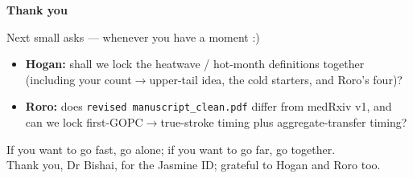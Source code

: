 \documentclass[aspectratio=169,10pt]{beamer}
\begin{document}
\begin{frame}[plain]
  \vspace{1.1cm}
  {\color{LaidlawNavy}\LARGE\bfseries Thank you\par}
  \vspace{0.55em}
  {\large\color{LaidlawTeal}
  Next small asks --- whenever you have a moment :)\par}

  \vspace{0.85em}
  \footnotesize
  \begin{itemize}
    \item \textbf{Hogan:} shall we lock the heatwave / hot-month definitions together
      (including your count$\to$upper-tail idea, the cold starters, and Roro's four)?
    \item \textbf{Roro:} does \texttt{revised manuscript\_clean.pdf} differ from medRxiv v1,
      and can we lock first-GOPC$\to$true-stroke timing plus aggregate-transfer timing?
  \end{itemize}

  \vspace{1.0em}
  {\small
  If you want to go fast, go alone; if you want to go far, go together.\\[0.25em]
  Thank you, Dr Bishai, for the Jasmine ID; grateful to Hogan and Roro too.
  \par}
\end{frame}
\end{document}

